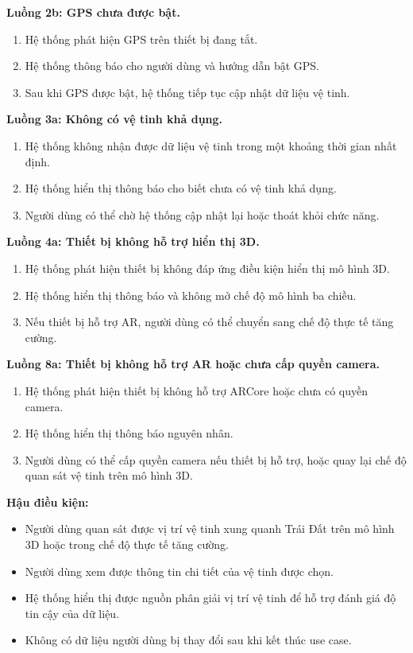 \documentclass[../DoAn.tex]{subfiles}
\begin{document}
\textbf{Luồng 2b: GPS chưa được bật.}
\begin{enumerate}[label=2b.\arabic*., leftmargin=2.6em, align=left, labelsep=0.5em]
    \item Hệ thống phát hiện GPS trên thiết bị đang tắt.
    \item Hệ thống thông báo cho người dùng và hướng dẫn bật GPS.
    \item Sau khi GPS được bật, hệ thống tiếp tục cập nhật dữ liệu vệ tinh.
\end{enumerate}

\textbf{Luồng 3a: Không có vệ tinh khả dụng.}
\begin{enumerate}[label=3a.\arabic*., leftmargin=2.6em, align=left, labelsep=0.5em]
    \item Hệ thống không nhận được dữ liệu vệ tinh trong một khoảng thời gian nhất định.
    \item Hệ thống hiển thị thông báo cho biết chưa có vệ tinh khả dụng.
    \item Người dùng có thể chờ hệ thống cập nhật lại hoặc thoát khỏi chức năng.
\end{enumerate}

\textbf{Luồng 4a: Thiết bị không hỗ trợ hiển thị 3D.}
\begin{enumerate}[label=4a.\arabic*., leftmargin=2.6em, align=left, labelsep=0.5em]
    \item Hệ thống phát hiện thiết bị không đáp ứng điều kiện hiển thị mô hình 3D.
    \item Hệ thống hiển thị thông báo và không mở chế độ mô hình ba chiều.
    \item Nếu thiết bị hỗ trợ AR, người dùng có thể chuyển sang chế độ thực tế tăng cường.
\end{enumerate}

\textbf{Luồng 8a: Thiết bị không hỗ trợ AR hoặc chưa cấp quyền camera.}
\begin{enumerate}[label=8a.\arabic*., leftmargin=2.6em, align=left, labelsep=0.5em]
    \item Hệ thống phát hiện thiết bị không hỗ trợ ARCore hoặc chưa có quyền camera.
    \item Hệ thống hiển thị thông báo nguyên nhân.
    \item Người dùng có thể cấp quyền camera nếu thiết bị hỗ trợ, hoặc quay lại chế độ quan sát vệ tinh trên mô hình 3D.
\end{enumerate}

\textbf{Hậu điều kiện:}
\begin{itemize}
    \item Người dùng quan sát được vị trí vệ tinh xung quanh Trái Đất trên mô hình 3D hoặc trong chế độ thực tế tăng cường.
    \item Người dùng xem được thông tin chi tiết của vệ tinh được chọn.
    \item Hệ thống hiển thị được nguồn phân giải vị trí vệ tinh để hỗ trợ đánh giá độ tin cậy của dữ liệu.
    \item Không có dữ liệu người dùng bị thay đổi sau khi kết thúc use case.
\end{itemize}
\end{document}
